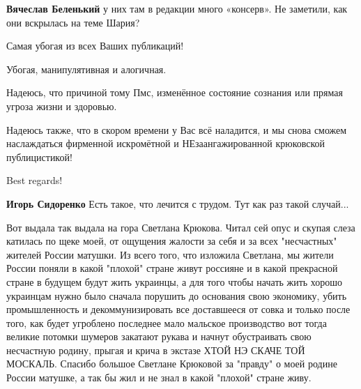 \begin{itemize}
\begin{itemize}
 
\textbf{Вячеслав Беленький} у них там в редакции много «консерв». Не заметили, как они вскрылась на теме Шария?

\end{itemize}

 

Самая убогая из всех Ваших публикаций!

Убогая, манипулятивная и алогичная.

Надеюсь, что причиной тому Пмс, изменённое состояние сознания или прямая угроза
жизни и здоровью.

Надеюсь также, что в скором времени у Вас всё наладится, и мы снова сможем
наслаждаться фирменной искромётной и НЕзаангажированной крюковской
публицистикой!

Best regards!

\begin{itemize}
 
\textbf{Игорь Сидоренко} Есть такое, что лечится с трудом. Тут как раз такой случай...
\end{itemize}

 

Вот выдала так выдала на гора Светлана Крюкова. Читал сей опус и скупая слеза
катилась по щеке моей, от ощущения жалости за себя и за всех "несчастных"
жителей России матушки. Из всего того, что изложила Светлана, мы жители России
поняли в какой "плохой" стране живут россияне и в какой прекрасной стране в
будущем будут жить украинцы, а для того чтобы начать жить хорошо украинцам
нужно было сначала порушить до основания свою экономику, убить промышленность и
декоммунизировать все доставшееся от совка и только после того, как будет
угроблено последнее мало мальское производство вот тогда великие потомки
шумеров закатают рукава и начнут обустраивать свою несчастную родину, прыгая и
крича в экстазе ХТОЙ НЭ СКАЧЕ ТОЙ МОСКАЛЬ. Спасибо большое Светлане Крюковой за
"правду" о моей родине России матушке, а так бы жил и не знал в какой "плохой"
стране живу.


\end{itemize}
